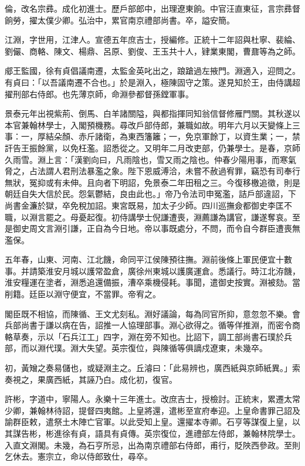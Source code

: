 \begin{pinyinscope}
倫，改名宗彞。成化初進士。歷戶部郎中，出理遼東餉。中官汪直東征，言宗彞督餉勞，擢太僕少卿。弘治中，累官南京禮部尚書。卒，謚安簡。

江淵，字世用，江津人。宣德五年庶吉士，授編修。正統十二年詔與杜寧、裴綸、劉儼、商輅、陳文、楊鼎、呂原、劉俊、王玉共十人，肄業東閣，曹鼐等為之師。

郕王監國，徐有貞倡議南遷，太監金英叱出之，踉蹌過左掖門。淵適入，迎問之。有貞曰：「以吾議南遷不合也。」於是淵入，極陳固守之策。遂見知於王，由侍講超擢刑部右侍郎。也先薄京師，命淵參都督孫鏜軍事。

景泰元年出視紫荊、倒馬、白羊諸關隘，與都指揮同知翁信督修雁門關。其秋遂以本官兼翰林學士，入閣預機務。尋改戶部侍郎，兼職如故。明年六月以天變條上三事：一，厚結朵顏、赤斤諸衛，為東西籓籬；一，免京軍餘丁，以資生業；一，禁訐告王振餘黨，以免枉濫。詔悉從之。又明年二月改吏部，仍兼學士。是春，京師久雨雪。淵上言：「漢劉向曰，凡雨陰也，雪又雨之陰也。仲春少陽用事，而寒氣脅之，占法謂人君刑法暴濫之象。陛下恩威溥洽，未嘗不赦過宥罪，竊恐有司奉行無狀，冤抑或有未伸。且向者下明詔，免景泰二年田租之三。今復移檄追徵，則是朝廷自失大信於民。怨氣鬱結，良由此也。」帝乃令法司申冤濫，詰戶部違詔，下尚書金濂於獄，卒免稅加詔。東宮既易，加太子少師。四川巡撫僉都御史李匡不職，以淵言罷之。母憂起復。初侍講學士倪謙遭喪，淵薦謙為講官，謙遂奪哀。至是御史周文言淵引謙，正自為今日地。帝以事既處分，不問，而令自今群臣遭喪無濫保。

五年春，山東、河南、江北饑，命同平江侯陳預往撫。淵前後條上軍民便宜十數事。并請築淮安月城以護常盈倉，廣徐州東城以護廣運倉。悉議行。時江北洊饑，淮安糧運在塗者，淵悉追還備振，漕卒乘機侵耗。事聞，遣御史按實。淵被劾。當削籍。廷臣以淵守便宜，不當罪。帝宥之。

閣臣既不相協，而陳循、王文尤刻私。淵好議論，每為同官所抑，意忽忽不樂。會兵部尚書于謙以病在告，詔推一人協理部事。淵心欲得之。循等佯推淵，而密令商輅草奏，示以「石兵江工」四字，淵在旁不知也。比詔下，調工部尚書石璞於兵部，而以淵代璞。淵大失望。英宗復位，與陳循等俱謫戍遼東，未幾卒。

初，黃矰之奏易儲也，或疑淵主之。丘濬曰：「此易辨也，廣西紙與京師紙異。」索奏視之，果廣西紙，其誣乃白。成化初，復官。

許彬，字道中，寧陽人。永樂十三年進士。改庶吉士，授檢討。正統末，累遷太常少卿，兼翰林待詔，提督四夷館。上皇將還，遣彬至宣府奉迎。上皇命書罪己詔及諭群臣敕，遣祭土木陣亡官軍。以此受知上皇。還擢本寺卿。石亨等謀復上皇，以其謀告彬，彬進徐有貞，語具有貞傳。英宗復位，進禮部左侍郎，兼翰林院學士。入直文淵閣。未幾，為石亨所忌，出為南京禮部右侍郎，甫行，貶陜西參政。至則乞休去。憲宗立，命以侍郎致仕，尋卒。


\end{pinyinscope}
